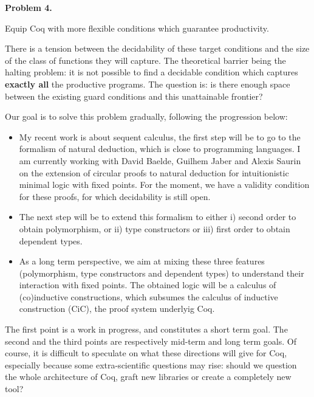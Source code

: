 \documentclass{article}
\begin{document}
\begin{center}
\begin{bclogo}[logo= ,arrondi = 0.1, couleur = green!10,  epBarre = 0]{}
  \vspace{-10pt}
  \textbf{Problem 4.}
  
  Equip Coq with more flexible conditions which guarantee productivity. 
\end{bclogo}
\end{center}
There is a tension  between the decidability of these target conditions and the size of the class of functions they will capture. The theoretical barrier being the halting problem:
it is not possible to find a decidable condition which captures \textbf{exactly all} the productive programs. The question is: is there enough space between the existing guard conditions and this unattainable frontier?

\smallskip
Our goal is to solve this problem gradually, following the progression below:
\begin{itemize}
\item My recent work is about sequent calculus, the first step will be to go to the formalism of natural deduction, which is close to programming languages. I am currently working with 
David Baelde, Guilhem Jaber and Alexis Saurin on the extension of circular proofs to natural deduction for intuitionistic minimal logic with fixed points. For the moment, we have a validity condition  for these proofs, for which decidability is still open.


\item The next step will be to extend this formalism to either  i) second order to obtain polymorphism, or ii) type constructors or iii) first order to obtain dependent types.  

\item As a long term perspective, we aim at mixing these three features (polymorphism, type constructors and dependent types) to understand their interaction with fixed points. The obtained logic will be a calculus of (co)inductive constructions, which subsumes the calculus of inductive construction (CiC), the proof system underlyig Coq.
  \end{itemize}


\smallskip
The first point is a work in progress, and constitutes a short term goal. The second and the third points are respectively mid-term and long term goals. Of course, it is difficult to speculate on what these directions will give for Coq, especially because some extra-scientific questions may rise: should we question the whole architecture of Coq, graft new libraries or create a completely new tool? 
  
\end{document}
